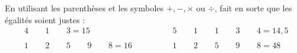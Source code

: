 \documentclass[a4paper,12pt]{article}
\begin{document}
\begin{exercice}
	En utilisant les parenthèses et les symboles $+, -, ×$ ou $÷$, fait en sorte que les égalités soient justes :
	\begin{align*}
		4 \hspace{2em} 1 \hspace{2em} 3 = 15 \hspace{4em}                              & 5 \hspace{2em} 1 \hspace{2em} 1 \hspace{2em} 3 \hspace{2em} 4 = 14,5 \\ & \\
		1 \hspace{2em} 2 \hspace{2em} 5 \hspace{2em} 9 \hspace{2em} 8 = 16 \hspace{4em} & 1 \hspace{2em} 2 \hspace{2em} 5 \hspace{2em} 9 \hspace{2em} 8 = 48
	\end{align*}
\end{exercice}
\end{document}
